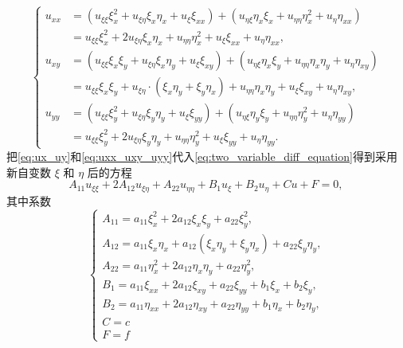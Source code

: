 \begin{equation}
    \left\{\begin{aligned}
        u_{x x} & =\left(u_{\xi \xi} \xi_x^2+u_{\xi \eta} \xi_x \eta_x+u_{\xi} \xi_{x x}\right)+\left(u_{\eta \xi} \eta_x \xi_x+u_{\eta \eta} \eta_x^2+u_\eta \eta_{x x}\right) \\
        & =u_{\xi \xi} \xi_x^2+2 u_{\xi \eta} \xi_x \eta_x+u_{\eta \eta} \eta_x^2+u_{\xi} \xi_{x x}+u_\eta \eta_{x x}, \\
        u_{x y} & =\left(u_{\xi \xi} \xi_x \xi_y+u_{\xi \eta} \xi_x \eta_y+u_{\xi} \xi_{x y}\right)+\left(u_{\eta \xi} \eta_x \xi_y+u_{\eta \eta} \eta_x \eta_y+u_\eta \eta_{x y}\right) \\
        & =u_{\xi \xi} \xi_x \xi_y+u_{\xi \eta} \cdot\left(\xi_x \eta_y+\xi_y \eta_x\right)+u_{\eta \eta} \eta_x \eta_y+u_{\xi} \xi_{x y}+u_\eta \eta_{x y}, \\
        u_{y y} & =\left(u_{\xi \xi} \xi_y^2+u_{\xi \eta} \xi_y \eta_y+u_{\xi} \xi_{y y}\right)+\left(u_{\eta \xi} \eta_y \xi_y+u_{\eta \eta} \eta_y^2+u_\eta \eta_{y y}\right) \\
        & =u_{\xi \xi} \xi_y^2+2 u_{\xi \eta} \xi_y \eta_y+u_{\eta \eta} \eta_y^2+u_{\xi} \xi_{y y}+u_\eta \eta_{y y} .
        \end{aligned}\right.
        \label{eq:uxx_uxy_uyy}
\end{equation}
把\eqref{eq:ux_uy}和\eqref{eq:uxx_uxy_uyy}代入\eqref{eq:two_variable_diff_equation}得到采用新自变数 $\xi$ 和 $\eta$ 后的方程
\begin{equation}
    A_{11} u_{\xi \xi}+2 A_{12} u_{\xi \eta}+A_{22} u_{\eta \eta}+B_1 u_{\xi}+B_2 u_\eta+C u+F=0 \text {, }
    \label{eq:two_variable_transformed_diff_equation}
\end{equation}
其中系数
\begin{equation}
    \left\{\begin{array}{l}A_{11}=a_{11} \xi_x^2+2 a_{12} \xi_x \xi_y+a_{22} \xi_y^2, 
        \\ 
        A_{12}=a_{11} \xi_x \eta_x+a_{12}\left(\xi_x \eta_y+\xi_y \eta_x\right)+a_{22} \xi_y \eta_y, 
        \\ A_{22}=a_{11} \eta_x^2+2 a_{12} \eta_x \eta_y+a_{22} \eta_y^2, 
        \\ B_1=a_{11} \xi_{x x}+2 a_{12} \xi_{x y}+a_{22} \xi_{y y}+b_1 \xi_x+b_2 \xi_y, 
        \\ B_2=a_{11} \eta_{x x}+2 a_{12} \eta_{x y}+a_{22} \eta_{y y}+b_1 \eta_x+b_2 \eta_y, 
        \\ C=c 
        \\ F=f\end{array}\right.
        \label{eq:transformed_coeff}
\end{equation}
